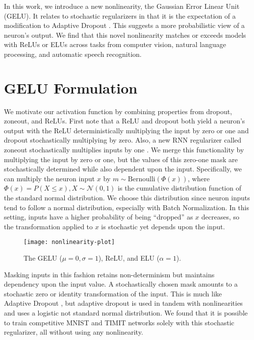 \documentclass{article}
\begin{document}
In this work, we introduce a new nonlinearity, the Gaussian Error Linear Unit (GELU). It relates to stochastic regularizers in that it is the expectation of a modification to Adaptive Dropout \citep{standout}. This suggests a more probabilistic view of a neuron's output. %
We find that this novel nonlinearity matches or exceeds models with ReLUs or ELUs across tasks from computer vision, natural language processing, and automatic speech recognition.


\section{GELU Formulation}

We motivate our activation function by combining properties from dropout, zoneout, and ReLUs. First note that a ReLU and dropout 
both %
yield a neuron's output with the ReLU deterministically multiplying the input by zero or one and dropout stochastically multiplying by zero. Also, a new RNN regularizer called zoneout stochastically multiplies inputs by one \citep{zoneout}. We merge this functionality by multiplying the input by zero or one, but the values of this zero-one mask are stochastically determined 
while also %
dependent upon the input. Specifically, we can multiply the neuron input $x$ by $m \sim \text{Bernoulli}(\Phi(x))$, where $\Phi(x) = P(X\le x), X\sim \mathcal{N}(0,1)$ is the cumulative distribution function of the standard normal distribution. We choose this distribution since neuron inputs tend to follow a normal distribution, especially with Batch Normalization. In this setting, inputs have a higher probability of being ``dropped'' as $x$ decreases, so the transformation applied to $x$ is stochastic yet depends upon the input.
\begin{wrapfigure}{r}{0.58\textwidth}
	\centering
    \texttt{[image: nonlinearity-plot]}
  	\caption{The GELU ($\mu=0, \sigma=1$), ReLU, and ELU ($\alpha=1$).}
    \label{fig:nonlinearityplot}
\end{wrapfigure}
Masking inputs in this fashion retains non-determinism but maintains dependency upon the input value. A stochastically chosen mask amounts to a stochastic zero or identity transformation of the input. This is much like Adaptive Dropout \citep{standout}, but adaptive dropout is used in tandem with nonlinearities and uses a logistic not standard normal distribution. We found that it is possible to train competitive MNIST and TIMIT networks solely with this stochastic regularizer, all without using any nonlinearity.
\end{document}
